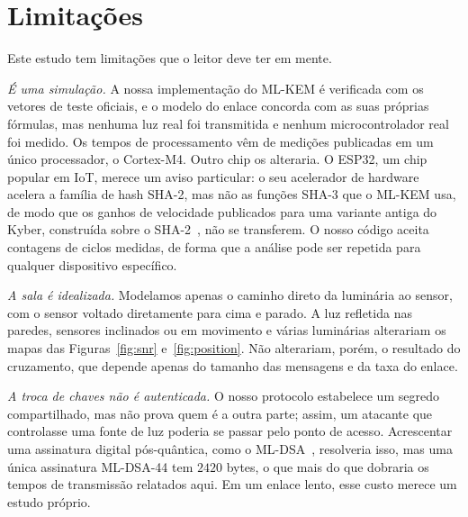 \documentclass[12pt]{article}
\begin{document}
\section{Limitações}\label{sec:limits}
Este estudo tem limitações que o leitor deve ter em mente.

\emph{É uma simulação.} A nossa implementação do ML-KEM é verificada com os
vetores de teste oficiais, e o modelo do enlace concorda com as suas próprias
fórmulas, mas nenhuma luz real foi transmitida e nenhum microcontrolador real
foi medido. Os tempos de processamento vêm de medições publicadas em um único
processador, o Cortex-M4. Outro chip os alteraria. O ESP32, um chip popular em
IoT, merece um aviso particular: o seu acelerador de hardware acelera a família
de hash SHA-2, mas não as funções SHA-3 que o ML-KEM usa, de modo que os ganhos
de velocidade publicados para uma variante antiga do Kyber, construída sobre o
SHA-2~\cite{segatz2025kyberesp32}, não se transferem. O nosso código aceita
contagens de ciclos medidas, de forma que a análise pode ser repetida para
qualquer dispositivo específico.

\emph{A sala é idealizada.} Modelamos apenas o caminho direto da luminária ao
sensor, com o sensor voltado diretamente para cima e parado. A luz refletida
nas paredes, sensores inclinados ou em movimento e várias luminárias alterariam
os mapas das Figuras~\ref{fig:snr} e~\ref{fig:position}. Não alterariam, porém, o
resultado do cruzamento, que depende apenas do tamanho das mensagens e da taxa
do enlace.

\emph{A troca de chaves não é autenticada.} O nosso protocolo estabelece um
segredo compartilhado, mas não prova quem é a outra parte; assim, um atacante
que controlasse uma fonte de luz poderia se passar pelo ponto de acesso.
Acrescentar uma assinatura digital pós-quântica, como o
ML-DSA~\cite{fips204}, resolveria isso, mas uma única assinatura ML-DSA-44 tem
$2420$ bytes, o que mais do que dobraria os tempos de transmissão relatados
aqui. Em um enlace lento, esse custo merece um estudo próprio.

\end{document}
